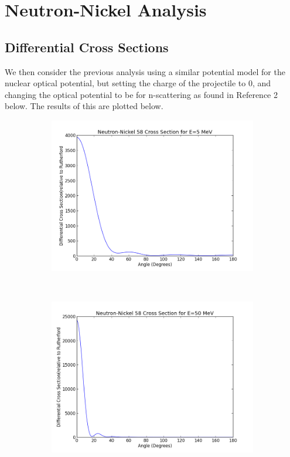\documentclass[paper=a4, fontsize=11pt]{scrartcl} %
\numberwithin{equation}{section} %
\numberwithin{figure}{section} %
\numberwithin{table}{section} %
\begin{document}
\section{Neutron-Nickel Analysis}
\subsection{Differential Cross Sections}
We then consider the previous analysis using a similar potential model for the nuclear optical potential, but setting the charge of the projectile to 0, and changing the optical potential to be for n-scattering as found in Reference 2 below. The results of this are plotted below.\\


 \begin{figure}[hbt]
        \centering
        \begin{subfigure}[b!]{0.35\textwidth}
                \includegraphics[width=\textwidth]{NeutronNi5.png}
        \end{subfigure}%
        ~ %
\quad
        \begin{subfigure}[b!]{0.35\textwidth}
                \includegraphics[width=\textwidth]{NeutronNi50.png}
        \end{subfigure}


\end{figure}
\end{document}
